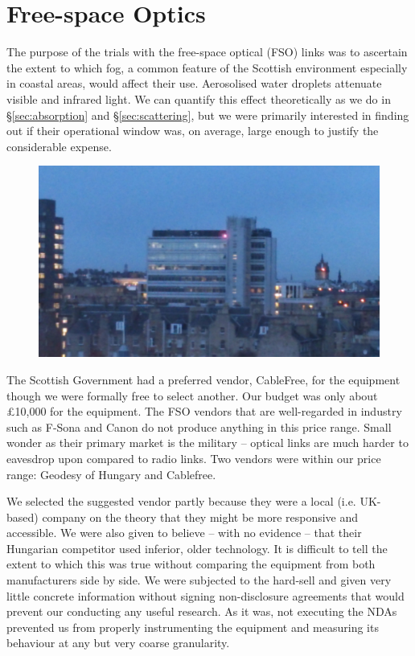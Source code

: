 
\section{Free-space Optics}
\label{sec:fso}

The purpose of the trials with the free-space optical (FSO) links was to
ascertain the extent to which fog, a common feature of the Scottish
environment especially in coastal areas, would affect their
use. Aerosolised water droplets attenuate visible and infrared
light. We can quantify this effect theoretically as we do in
\S\ref{sec:absorption} and \S\ref{sec:scattering}, but we were
primarily interested in finding out if their operational window was,
on average, large enough to justify the considerable expense.
\begin{figure}
  \includegraphics[width=\textwidth]{at-laser.jpg}
\end{figure}

The Scottish Government had a preferred vendor, CableFree, for the
equipment though we were formally free to select another. Our budget
was only about \pounds 10,000 for the equipment. The FSO vendors that
are well-regarded in industry such as F-Sona and Canon do not produce
anything in this price range. Small wonder as their primary market is
the military -- optical links are much harder to eavesdrop upon
compared to radio links. Two vendors were within our price range:
Geodesy of Hungary and Cablefree.

We selected the suggested vendor partly because they were a local
(i.e. UK-based) company on the theory that they might be more
responsive and accessible. We were also given to believe -- with no
evidence -- that their Hungarian competitor used inferior, older
technology. It is difficult to tell the extent to which this was
true without comparing the equipment from both manufacturers side by
side. We were subjected to the hard-sell and given very little
concrete information without signing non-disclosure agreements that
would prevent our conducting any useful research. As it was, not
executing the NDAs prevented us from properly instrumenting the
equipment and measuring its behaviour at any but very coarse
granularity.


